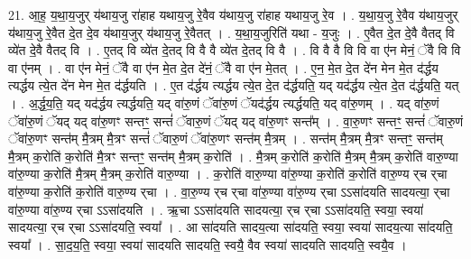 \documentclass[17pt]{extarticle}
\begin{document}
21. आ॒ह॒ य॒था॒य॒जुर् य॑थाय॒जु रा॑हाह यथाय॒जु रे॒वैव य॑थाय॒जु रा॑हाह यथाय॒जु रे॒व । . य॒था॒य॒जु रे॒वैव य॑थाय॒जुर् य॑थाय॒जु रे॒वैत दे॒त दे॒व य॑थाय॒जुर् य॑थाय॒जु रे॒वैतत् । . य॒था॒य॒जुरिति॑ यथा - य॒जुः । . ए॒वैत दे॒त दे॒वै वैतद् वि व्ये॑त दे॒वै वैतद् वि । . ए॒तद् वि व्ये॑त दे॒तद् वि वै वै व्ये॑त दे॒तद् वि वै । . वि वै वै वि वि वा ए॑न मेनं॒ ॅवै वि वि वा ए॑नम् । . वा ए॑न मेनं॒ ॅवै वा ए॑न मे॒त दे॒त दे॑नं॒ ॅवै वा ए॑न मे॒तत् । . ए॒न॒ मे॒त दे॒त दे॑न मेन मे॒त द॑र्द्धय त्यर्द्धय त्ये॒त दे॑न मेन मे॒त द॑र्द्धयति । . ए॒त द॑र्द्धय त्यर्द्धय त्ये॒त दे॒त द॑र्द्धयति॒ यद् यद॑र्द्धय त्ये॒त दे॒त द॑र्द्धयति॒ यत् । . अ॒र्द्ध॒य॒ति॒ यद् यद॑र्द्धय त्यर्द्धयति॒ यद् वा॑रु॒णं ॅवा॑रु॒णं ॅयद॑र्द्धय त्यर्द्धयति॒ यद् वा॑रु॒णम् । . यद् वा॑रु॒णं ॅवा॑रु॒णं ॅयद् यद् वा॑रु॒णꣳ सन्तꣳ॒॒ सन्तं॑ ॅवारु॒णं ॅयद् यद् वा॑रु॒णꣳ सन्त᳚म् । . वा॒रु॒णꣳ सन्तꣳ॒॒ सन्तं॑ ॅवारु॒णं ॅवा॑रु॒णꣳ सन्त॑म् मै॒त्रम् मै॒त्रꣳ सन्तं॑ ॅवारु॒णं ॅवा॑रु॒णꣳ सन्त॑म् मै॒त्रम् । . सन्त॑म् मै॒त्रम् मै॒त्रꣳ सन्तꣳ॒॒ सन्त॑म् मै॒त्रम् क॒रोति॑ क॒रोति॑ मै॒त्रꣳ सन्तꣳ॒॒ सन्त॑म् मै॒त्रम् क॒रोति॑ । . मै॒त्रम् क॒रोति॑ क॒रोति॑ मै॒त्रम् मै॒त्रम् क॒रोति॑ वारु॒ण्या वा॑रु॒ण्या क॒रोति॑ मै॒त्रम् मै॒त्रम् क॒रोति॑ वारु॒ण्या । . क॒रोति॑ वारु॒ण्या वा॑रु॒ण्या क॒रोति॑ क॒रोति॑ वारु॒ण्य र्‌च र्‌चा वा॑रु॒ण्या क॒रोति॑ क॒रोति॑ वारु॒ण्य र्‌चा । . वा॒रु॒ण्य र्‌च र्‌चा वा॑रु॒ण्या वा॑रु॒ण्य र्‌चा ऽऽसा॑दयति सादयत्या॒ र्‌चा वा॑रु॒ण्या वा॑रु॒ण्य र्‌चा ऽऽसा॑दयति । . ऋ॒चा ऽऽसा॑दयति सादयत्या॒ र्‌च र्‌चा ऽऽसा॑दयति॒ स्वया॒ स्वया॑ सादयत्या॒ र्‌च र्‌चा ऽऽसा॑दयति॒ स्वया᳚ । . आ सा॑दयति सादय॒त्या सा॑दयति॒ स्वया॒ स्वया॑ सादय॒त्या सा॑दयति॒ स्वया᳚ । . सा॒द॒य॒ति॒ स्वया॒ स्वया॑ सादयति सादयति॒ स्वयै॒ वैव स्वया॑ सादयति सादयति॒ स्वयै॒व । \newline
\end{document}
